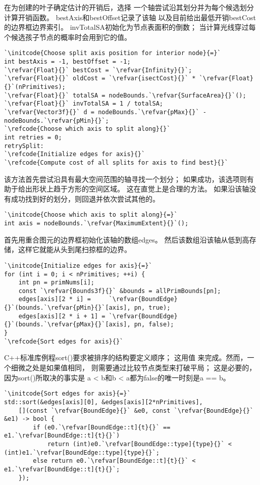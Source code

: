 在为创建的叶子确定估计的开销后，选择
一个轴尝试沿其划分并为每个候选划分计算开销函数。
{\ttfamily bestAxis}和{\ttfamily bestOffset}记录了该轴
以及目前给出最低开销{\ttfamily bestCost}的边界框边界索引。
{\ttfamily invTotalSA}初始化为节点表面积的倒数；
当计算光线穿过每个候选孩子节点的概率时会用到它的值。
\begin{lstlisting}
`\initcode{Choose split axis position for interior node}{=}`
int bestAxis = -1, bestOffset = -1;
`\refvar{Float}{}` bestCost = `\refvar{Infinity}{}`;
`\refvar{Float}{}` oldCost = `\refvar{isectCost}{}` * `\refvar{Float}{}`(nPrimitives);
`\refvar{Float}{}` totalSA = nodeBounds.`\refvar{SurfaceArea}{}`();
`\refvar{Float}{}` invTotalSA = 1 / totalSA;
`\refvar{Vector3f}{}` d = nodeBounds.`\refvar{pMax}{}` - nodeBounds.`\refvar{pMin}{}`;
`\refcode{Choose which axis to split along}{}`
int retries = 0;
retrySplit:
`\refcode{Initialize edges for axis}{}`
`\refcode{Compute cost of all splits for axis to find best}{}`
\end{lstlisting}

该方法首先尝试沿具有最大空间范围的轴寻找一个划分；
如果成功，该选项则有助于给出形状上趋于方形的空间区域。
这在直觉上是合理的方法。
如果沿该轴没有成功找到好的划分，则回退并依次尝试其他的。
\begin{lstlisting}
`\initcode{Choose which axis to split along}{=}`
int axis = nodeBounds.`\refvar{MaximumExtent}{}`();
\end{lstlisting}

首先用重合图元的边界框初始化该轴的数组{\ttfamily edges}。
然后该数组沿该轴从低到高存储，这样它就能从头到尾扫掠框的边界。
\begin{lstlisting}
`\initcode{Initialize edges for axis}{=}`
for (int i = 0; i < nPrimitives; ++i) {
    int pn = primNums[i];
    const `\refvar{Bounds3f}{}` &bounds = allPrimBounds[pn];
    edges[axis][2 * i] =     `\refvar{BoundEdge}{}`(bounds.`\refvar{pMin}{}`[axis], pn, true);
    edges[axis][2 * i + 1] = `\refvar{BoundEdge}{}`(bounds.`\refvar{pMax}{}`[axis], pn, false);
}
`\refcode{Sort edges for axis}{}`
\end{lstlisting}

C++标准库例程{\ttfamily sort()}要求被排序的结构要定义顺序；
这用值
来完成。然而，一个细微之处是如果值相同，
则需要通过比较节点类型来打破平局；
这是必要的，因为{\ttfamily sort()}所取决的事实是
{\ttfamily a < b}和{\ttfamily b < a}都为{\ttfamily false}的唯一时刻是{\ttfamily a == b}。
\begin{lstlisting}
`\initcode{Sort edges for axis}{=}`
std::sort(&edges[axis][0], &edges[axis][2*nPrimitives],
    [](const `\refvar{BoundEdge}{}` &e0, const `\refvar{BoundEdge}{}` &e1) -> bool {
        if (e0.`\refvar[BoundEdge::t]{t}{}` == e1.`\refvar[BoundEdge::t]{t}{}`)
            return (int)e0.`\refvar[BoundEdge::type]{type}{}` < (int)e1.`\refvar[BoundEdge::type]{type}{}`;
        else return e0.`\refvar[BoundEdge::t]{t}{}` < e1.`\refvar[BoundEdge::t]{t}{}`; 
    });
\end{lstlisting}

